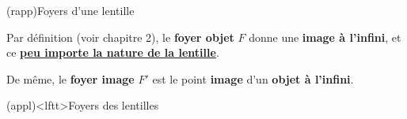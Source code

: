\documentclass[../../main/main.tex]{subfiles}
\begin{document}
\begin{tcn}[label=rapp:foy](rapp){Foyers d'une lentille}

	Par définition (voir chapitre 2), le \textbf{foyer objet} $F$ donne une
	\textbf{image à l'infini}, et ce \textbf{\underline{peu importe la nature de
			la lentille}}.\bigbreak

	De même, le \textbf{foyer image} $F'$ est le point \textbf{image} d'un
	\textbf{objet à l'infini}.

\end{tcn}
\begin{tcb*}[label=appl:lentfoy, sidebyside](appl)<lftt>{Foyers des lentilles}
	\begin{center}
\end{center}
\end{tcb*}
\end{document}
